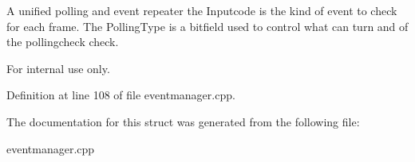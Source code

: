 A unified polling and event repeater the Inputcode is the kind of event to check for each frame. The PollingType is a bitfield used to control what can turn and of the pollingcheck check. 

\begin{DoxyInternal}{For internal use only.}
\end{DoxyInternal}


Definition at line 108 of file eventmanager.cpp.



The documentation for this struct was generated from the following file:\begin{DoxyCompactItemize}
\item 
eventmanager.cpp\end{DoxyCompactItemize}
